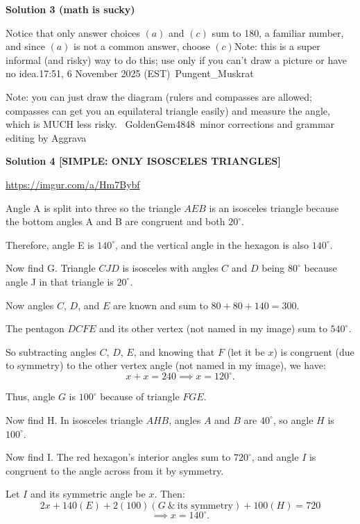 \begin{enumerate}
 



\textbf{Solution 3 (math is sucky)}

Notice that only answer choices $(a)$ and $(c)$ sum to 180, a familiar number, and since $(a)$ is not a common answer, choose $(c)$Note: this is a super informal (and risky) way to do this; use only if you can't draw a picture or have no idea.17:51, 6 November 2025 (EST)~Pungent\_Muskrat

 
Note: you can just draw the diagram (rulers and compasses are allowed; compasses can get you an equilateral triangle easily) and measure the angle, which is MUCH less risky. ~GoldenGem4848~minor corrections and grammar editing by Aggrava

 



\textbf{Solution 4 [SIMPLE: ONLY ISOSCELES TRIANGLES]}

\href{https://imgur.com/a/Hm7Bybf}{https://imgur.com/a/Hm7Bybf}

 Angle A is split into three so the triangle $AEB$ is an isosceles triangle because the bottom angles A and B are congruent and both $20^\circ$.

 Therefore, angle E is $140^\circ$, and the vertical angle in the hexagon is also $140^\circ$.

 Now find G. Triangle $CJD$ is isosceles with angles $C$ and $D$ being $80^\circ$ because angle J in that triangle is $20^\circ$.

 Now angles $C$, $D$, and $E$ are known and sum to $80 + 80 + 140 = 300$.

 The pentagon $DCFE$ and its other vertex (not named in my image) sum to $540^\circ$.

 So subtracting angles $C$, $D$, $E$, and knowing that $F$ (let it be $x$) is congruent (due to symmetry) to the other vertex angle (not named in my image),  we have:
 \[x + x = 240 \implies x = 120^\circ.\]

 Thus, angle $G$ is $100^\circ$ because of triangle $FGE$.

 Now find H. In isosceles triangle $AHB$, angles $A$ and $B$ are $40^\circ$, so angle $H$ is $100^\circ$.

 Now find I. The red hexagon’s interior angles sum to $720^\circ$, and angle $I$ is congruent to the angle across from it by symmetry.  

 Let $I$ and its symmetric angle be $x$.  Then:
 \[2x + 140(E) + 2(100)(G\ \&\ \text{its symmetry}) + 100(H) = 720\]
 \[\implies x = 140^\circ.\]


\end{enumerate}
